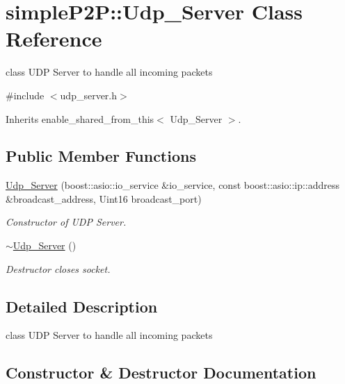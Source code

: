 \hypertarget{classsimpleP2P_1_1Udp__Server}{}\section{simple\+P2P\+:\+:Udp\+\_\+\+Server Class Reference}
\label{classsimpleP2P_1_1Udp__Server}


class U\+DP Server to handle all incoming packets  




{\ttfamily \#include $<$udp\+\_\+server.\+h$>$}



Inherits enable\+\_\+shared\+\_\+from\+\_\+this$<$ Udp\+\_\+\+Server $>$.

\subsection*{Public Member Functions}
\begin{DoxyCompactItemize}
\item 
\hyperlink{classsimpleP2P_1_1Udp__Server_ad2e7873688dea22fa7db5ae1ef86ba6f}{Udp\+\_\+\+Server} (boost\+::asio\+::io\+\_\+service \&io\+\_\+service, const boost\+::asio\+::ip\+::address \&broadcast\+\_\+address, Uint16 broadcast\+\_\+port)
\begin{DoxyCompactList}\small\item\em Constructor of U\+DP Server. \end{DoxyCompactList}\item 
\mbox{\label{classsimpleP2P_1_1Udp__Server_adde5307f34477b9bca29f8e2cb9077b0}} 
\hyperlink{classsimpleP2P_1_1Udp__Server_adde5307f34477b9bca29f8e2cb9077b0}{$\sim$\+Udp\+\_\+\+Server} ()
\begin{DoxyCompactList}\small\item\em Destructor closes socket. \end{DoxyCompactList}\end{DoxyCompactItemize}


\subsection{Detailed Description}
class U\+DP Server to handle all incoming packets 

\subsection{Constructor \& Destructor Documentation}
\mbox{\label{classsimpleP2P_1_1Udp__Server_ad2e7873688dea22fa7db5ae1ef86ba6f}} 
